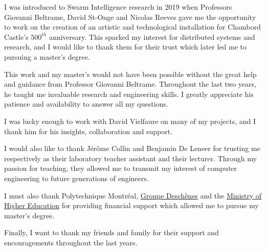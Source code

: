 %
I was introduced to Swarm Intelligence research in 2019 when Professors Giovanni Beltrame, David St-Onge and Nicolas Reeves gave me the opportunity to work on the creation of an artistic and technological installation for Chambord Castle's $500^{th}$ anniversary. This sparked my interest for distributed systems and research, and I would like to thank them for their trust which later led me to pursuing a master's degree.

This work and my master's would not have been possible without the great help and guidance from Professor Giovanni Beltrame. Throughout the last two years, he taught me invaluable research and engineering skills. I greatly appreciate his patience and availability to answer all my questions.  

I was lucky enough to work with David Vielfaure on many of my projects, and I thank him for his insights, collaboration and support.

I would also like to thank Jérôme Collin and Benjamin De Leneer for trusting me respectively as their laboratory teacher assistant and their lecturer. Through my passion for teaching, they allowed me to transmit my interest of computer engineering to future generations of engineers.

I must also thank Polytechnique Montréal, \href{https://www.groupedeschenes.com}{Groupe Deschênes} and the \href{https://www.quebec.ca/en/government/ministere/enseignement-superieur}{Ministry of Higher Education} for providing financial support which allowed me to pursue my master's degree. 

Finally, I want to thank my friends and family for their support and encouragements throughout the last years.
